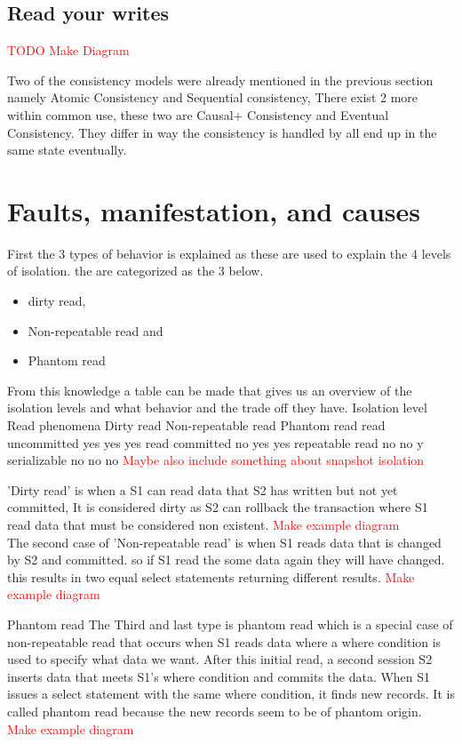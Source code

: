 \documentclass[a4paper,10pt,titlepage]{report}
\begin{document}
\subsection{Read your writes}
\textcolor{red}{TODO Make Diagram}

Two of the consistency models were already mentioned in the previous section namely Atomic Consistency and Sequential consistency, There exist 2 more within common use, these two are Causal+ Consistency and  Eventual Consistency. They differ in way the consistency is handled by all end up in the same state eventually.






\section{Faults, manifestation, and causes}


First the 3 types of behavior is explained as these are used to explain the 4 levels of isolation. the are categorized as the 3 below.
\begin{itemize}
\item dirty read,
\item Non-repeatable read and
\item Phantom read
\end{itemize}

From this knowledge a table can be made that gives us an overview of the isolation levels and what behavior and the trade off they have.
Isolation level	Read phenomena
Dirty read	Non-repeatable read	Phantom read
read uncommitted	yes	yes	yes
read committed	no	yes	yes
repeatable read	no	no	y
serializable	no	no	no
\textcolor{red}{Maybe also include something about snapshot isolation}



'Dirty read' is when a S1 can read data that S2 has written but not yet committed, It is considered dirty as S2 can rollback the transaction where S1 read data that must be considered non existent. \textcolor{red}{Make example diagram}
\\
The second case of 'Non-repeatable read' is when S1 reads data that is changed by S2 and committed. so if S1 read the some data again they will have changed. this results in two equal select statements returning different results.  \textcolor{red}{Make example diagram}

Phantom read
The Third and last type is phantom read which is a special case of non-repeatable read that occurs when S1 reads data where a where condition is used to specify what data we want. After this initial read, a second session S2 inserts data that meets S1's where condition and commits the data. When S1 issues a select statement with the same where condition, it finds new records. It is called phantom read because the new records seem to be of phantom origin.
 \textcolor{red}{Make example diagram}
\end{document}
